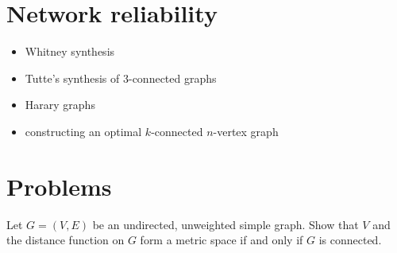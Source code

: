 
\section{Network reliability}

\begin{itemize}
\item Whitney synthesis

\item Tutte's synthesis of $3$-connected graphs

\item Harary graphs

\item constructing an optimal $k$-connected $n$-vertex graph
\end{itemize}



\section{Problems}

\begin{problem}
\item Let $G = (V,E)$ be an undirected, unweighted simple graph. Show
  that $V$ and the distance function on $G$
  form a metric space if and only if $G$ is connected.
\end{problem}
